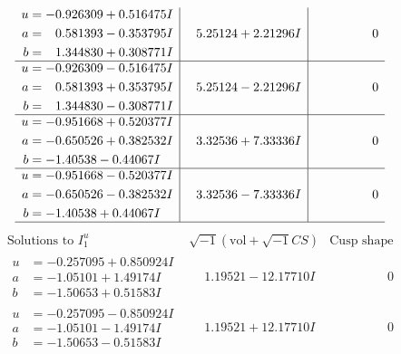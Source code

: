 \documentclass[1p]{elsarticle_modified}
\theoremstyle{definition}
\newcommand{\I}{\sqrt{-1}}
\begin{document}
$$\begin{array}{c|c|c}
\begin{aligned}
u &= -0.926309 + 0.516475 I \\
a &= \phantom{-}0.581393 - 0.353795 I \\
b &= \phantom{-}1.344830 + 0.308771 I\end{aligned}
 & \phantom{-}5.25124 + 2.21296 I & \phantom{-0.000000 } 0 \\ \hline\begin{aligned}
u &= -0.926309 - 0.516475 I \\
a &= \phantom{-}0.581393 + 0.353795 I \\
b &= \phantom{-}1.344830 - 0.308771 I\end{aligned}
 & \phantom{-}5.25124 - 2.21296 I & \phantom{-0.000000 } 0 \\ \hline\begin{aligned}
u &= -0.951668 + 0.520377 I \\
a &= -0.650526 + 0.382532 I \\
b &= -1.40538 - 0.44067 I\end{aligned}
 & \phantom{-}3.32536 + 7.33336 I & \phantom{-0.000000 } 0 \\ \hline\begin{aligned}
u &= -0.951668 - 0.520377 I \\
a &= -0.650526 - 0.382532 I \\
b &= -1.40538 + 0.44067 I\end{aligned}
 & \phantom{-}3.32536 - 7.33336 I & \phantom{-0.000000 } 0\\
 \hline 
 \end{array}$$\newpage$$\begin{array}{c|c|c}  
\text{Solutions to }I^u_{1}& \I (\text{vol} + \sqrt{-1}CS) & \text{Cusp shape}\\
 \hline 
\begin{aligned}
u &= -0.257095 + 0.850924 I \\
a &= -1.05101 + 1.49174 I \\
b &= -1.50653 + 0.51583 I\end{aligned}
 & \phantom{-}1.19521 - 12.17710 I & \phantom{-0.000000 } 0 \\ \hline\begin{aligned}
u &= -0.257095 - 0.850924 I \\
a &= -1.05101 - 1.49174 I \\
b &= -1.50653 - 0.51583 I\end{aligned}
 & \phantom{-}1.19521 + 12.17710 I & \phantom{-0.000000 } 0 \\ \hline\begin{aligned}

\end{aligned}
\end{array}$$
\end{document}
